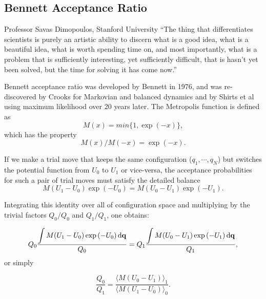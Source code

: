 \subsection{Bennett Acceptance Ratio\label{Sec:FEM:BAR}}
\begin{chapquote}{Professor Savas Dimopoulos, Stanford University}
	``The thing that differentiates scientists is purely an artistic ability to discern what is a good idea, what is a beautiful idea, what is worth spending time on, and most importantly, what is a problem that is sufficiently interesting, yet sufficiently difficult, that is hasn't yet been solved, but the time for solving it has come now.''
\end{chapquote}
Bennett acceptance ratio was developed by Bennett in 1976,\cite{BennettJComputPhys1976} and was re-discovered by Crooks\cite{CrooksPRE2000} for Markovian and balanced dynamics and by Shirts et al\cite{ShirtsPRL2003} using maximum likelihood over 20 years later. The Metropolis function is defined as
\begin{equation}
	M(x)=min\{1,\exp{(-x)}\},
\end{equation}
which has the property 
\begin{equation}
	M(x)/M(-x)=\exp{(-x)}.
\end{equation}

If we make a trial move that keeps the same configuration ($q_{1},\cdots,q_{N}$)
but switches the potential function from $U_{0}$ to $U_{1}$ or vice-versa, 
the acceptance probabilities for such a pair of trial moves must satisfy
the detailed balance
\begin{equation}
	M(U_{1}-U_{0})\exp{(-U_{0})}=M(U_{0}-U_{1})\exp{(-U_{1})}.
\end{equation}

Integrating this identity over all of configuration space and multiplying
by the trivial factors $Q_{0}/Q_{0}$ and $Q_{1}/Q_{1}$, one obtains:

\begin{equation}
	Q_{0}\frac{\displaystyle\int M(U_{1}-U_{0})\exp{(-U_{0})}\mathop{}\!\mathrm{d}\mathbf{{q}}}{Q_{0}}=Q_{1}\frac{\displaystyle\int M(U_{0}-U_{1})\exp{(-U_{1})}\mathop{}\!\mathrm{d}\mathbf{{q}}}{Q_{1}},
\end{equation}
or simply

\begin{equation}
	\frac{Q_{0}}{Q_{1}}=\frac{\langle M(U_{0}-U_{1})\rangle_{1}}{\langle M(U_{1}-U_{0})\rangle_{0}}.\label{eq:FEM:BAR:MetropolisRatio}
\end{equation}

